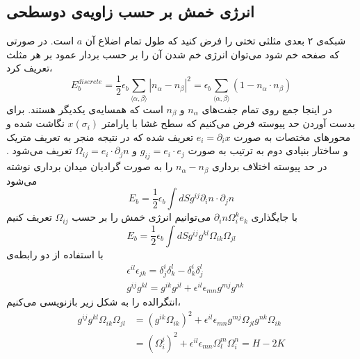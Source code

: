 


\subsection{
انرژی خمش بر حسب زاویه‌ی دوسطحی
}
 شبکه‌ی ۲ بعدی مثلثی تختی را فرض کنید که طول تمام اضلاع آن 
$a$
 است. در صورتی که صفحه خم شود می‌توان انرژی خم شدن آن را بر حسب بردار عمود بر هر مثلث تعریف کرد،
\begin{equation}
E_b^{discrete}=\frac{1}{2}\epsilon_b\sum_{\langle\alpha,\beta\rangle}|n_\alpha-n_\beta|^2=\epsilon_b\sum_{\langle\alpha,\beta\rangle}\left(1-n_\alpha\cdot n_\beta\right)
\label{eq:bending}
\end{equation}
در اینجا جمع روی تمام جفت‌های 
$n_\alpha$
و 
$n_\beta$ 
است که همسایه‌ی یکدیگر هستند. برای بدست‌ آوردن حد پیوسته‌ فرض می‌کنیم که سطح غشا با پارامتر 
$x(\sigma_i)$
نگاشت شده و محورهای مختصات به صورت 
$e_i=\partial_ix$
تعریف شده که در نتیجه منجر به تعریف متریک و ساختار بنیادی دوم
 به ترتیب به صورت 
$g_{ij}=e_i\cdot e_j$
و
$\Omega_{ij}=e_i\cdot\partial_jn$
تعریف می‌شود 
\cite{DubrovinModernGeometry}.
 در حد پیوسته اختلاف برداری 
$n_\alpha-n_\beta$
را به صورت گرادیان میدان برداری نوشته می‌شود
\begin{equation}
E_b=\frac{1}{2}\epsilon_b\int dSg^{ij}\partial_in\cdot\partial_jn
\end{equation}
با جایگذاری 
$\partial_in\Omega_i^ke_k$
می‌توانیم انرژی خمش را بر حسب 
$\Omega_{ij}$
تعریف کنیم
\begin{equation}
E_b=\frac{1}{2}\epsilon_b\int dSg^{ij}g^{kl}\Omega_{ik}\Omega_{jl}
\end{equation}
با استفاده از دو رابطه‌ی 
\begin{equation}
\begin{aligned}
&\epsilon^{il}\epsilon_{jk}=\delta_j^i\delta_k^l-\delta_k^i\delta_j^l\\
&g^{ij}g^{kl}=g^{ik}g^{jl}+\epsilon^{il}\epsilon_{mn}g^{mj}g^{nk}
\end{aligned}
\end{equation}
انتگرالده را به شکل زیر بازنویسی می‌کنیم،
\begin{equation}
\begin{aligned}
g^{ij}g^{kl}\Omega_{ik}\Omega_{jl}&=(g^{ik}\Omega_{ik})^2+\epsilon^{il}\epsilon_{mn}g^{mj}\Omega_{jl}g^{nk}\Omega_{ik}\\
&=(\Omega_i^i)^2+\epsilon^{il}\epsilon_{mn}\Omega_l^m\Omega_i^n=H-2K
\end{aligned}
\end{equation}
